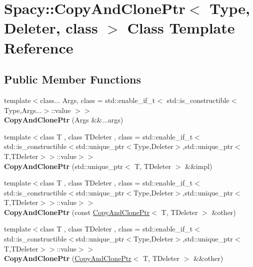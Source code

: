 \hypertarget{classSpacy_1_1CopyAndClonePtr}{}\section{Spacy\+:\+:Copy\+And\+Clone\+Ptr$<$ Type, Deleter, class $>$ Class Template Reference}
\label{classSpacy_1_1CopyAndClonePtr}
\subsection*{Public Member Functions}
\begin{DoxyCompactItemize}
\item 
\hypertarget{classSpacy_1_1CopyAndClonePtr_a4a45b1552350f354928ebdb78c9bf465}{}{\footnotesize template$<$class... Args, class  = std\+::enable\+\_\+if\+\_\+t$<$ std\+::is\+\_\+constructible$<$\+Type,\+Args...$>$\+::value $>$$>$ }\\{\bfseries Copy\+And\+Clone\+Ptr} (Args \&\&...args)\label{classSpacy_1_1CopyAndClonePtr_a4a45b1552350f354928ebdb78c9bf465}

\item 
\hypertarget{classSpacy_1_1CopyAndClonePtr_ad2d832237c3e222ff4a70ef3c9f8635c}{}{\footnotesize template$<$class T , class T\+Deleter , class  = std\+::enable\+\_\+if\+\_\+t$<$std\+::is\+\_\+constructible$<$std\+::unique\+\_\+ptr$<$\+Type,\+Deleter$>$,std\+::unique\+\_\+ptr$<$\+T,\+T\+Deleter$>$$>$\+::value$>$$>$ }\\{\bfseries Copy\+And\+Clone\+Ptr} (std\+::unique\+\_\+ptr$<$ T, T\+Deleter $>$ \&\&impl)\label{classSpacy_1_1CopyAndClonePtr_ad2d832237c3e222ff4a70ef3c9f8635c}

\item 
\hypertarget{classSpacy_1_1CopyAndClonePtr_a266149aab5908bf4b5e598f28bd9e550}{}{\footnotesize template$<$class T , class T\+Deleter , class  = std\+::enable\+\_\+if\+\_\+t$<$std\+::is\+\_\+constructible$<$std\+::unique\+\_\+ptr$<$\+Type,\+Deleter$>$,std\+::unique\+\_\+ptr$<$\+T,\+T\+Deleter$>$$>$\+::value$>$$>$ }\\{\bfseries Copy\+And\+Clone\+Ptr} (const \hyperlink{classSpacy_1_1CopyAndClonePtr}{Copy\+And\+Clone\+Ptr}$<$ T, T\+Deleter $>$ \&other)\label{classSpacy_1_1CopyAndClonePtr_a266149aab5908bf4b5e598f28bd9e550}

\item 
\hypertarget{classSpacy_1_1CopyAndClonePtr_a713670557a0a070e639e2e6970073a37}{}{\footnotesize template$<$class T , class T\+Deleter , class  = std\+::enable\+\_\+if\+\_\+t$<$std\+::is\+\_\+constructible$<$std\+::unique\+\_\+ptr$<$\+Type,\+Deleter$>$,std\+::unique\+\_\+ptr$<$\+T,\+T\+Deleter$>$$>$\+::value$>$$>$ }\\{\bfseries Copy\+And\+Clone\+Ptr} (\hyperlink{classSpacy_1_1CopyAndClonePtr}{Copy\+And\+Clone\+Ptr}$<$ T, T\+Deleter $>$ \&\&other)\label{classSpacy_1_1CopyAndClonePtr_a713670557a0a070e639e2e6970073a37}


\end{DoxyCompactItemize}
